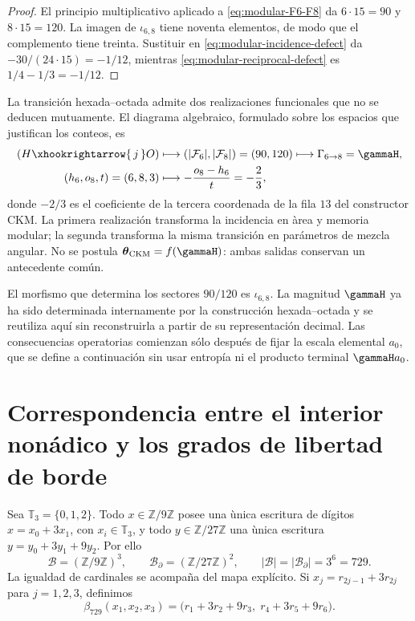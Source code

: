 \begin{proof}
El principio multiplicativo aplicado a
\cref{eq:modular-F6-F8} da \(6\cdot15=90\) y \(8\cdot15=120\).
La imagen de \(\iota_{6,8}\) tiene noventa elementos, de modo que el
complemento tiene treinta. Sustituir en
\cref{eq:modular-incidence-defect} da
\(-30/(24\cdot15)=-1/12\), mientras
\cref{eq:modular-reciprocal-defect} es
\(1/4-1/3=-1/12\).
\end{proof}

La transici\'on hexada--octada admite dos realizaciones funcionales que no
se deducen mutuamente. El diagrama algebraico, formulado sobre los espacios
que justifican los conteos, es
\begin{equation}
\label{eq:modular-68-two-readers}
\begin{aligned}
(H\xhookrightarrow{\,j\,}O)
&\longmapsto
\left(|\mathcal F_6|,|\mathcal F_8|\right)=(90,120)
\longmapsto\Gamma_{6\to8}=\gammaH,\\
(h_6,o_8,t)=(6,8,3)
&\longmapsto-\frac{o_8-h_6}{t}=-\frac23,
\end{aligned}
\end{equation}
donde \(-2/3\) es el coeficiente de la tercera coordenada de la fila
\(13\) del constructor CKM. La primera realizaci\'on transforma la
incidencia en \`area y memoria modular; la segunda transforma la misma
transici\'on en par\'ametros de mezcla angular.
No se postula \(\boldsymbol\theta_{\rm CKM}=f(\gammaH)\): ambas salidas
conservan un antecedente com\'un.

El morfismo que determina los sectores \(90/120\) es
\(\iota_{6,8}\). La magnitud \(\gammaH\) ya ha sido determinada internamente
por la construcci\'on hexada--octada y se reutiliza aqu\'i sin reconstruirla a
partir de su representaci\'on decimal. Las
consecuencias operatorias comienzan s\'olo despu\'es de fijar la escala
elemental \(a_0\), que se define a continuaci\'on sin usar entrop\'ia ni el
producto terminal \(\gammaH a_0\).

\section{Correspondencia entre el interior non\'adico y los grados de libertad de borde}

Sea \(\mathbb T_3=\{0,1,2\}\). Todo \(x\in\mathbb Z/9\mathbb Z\) posee
una \`unica escritura de d\'igitos
\(x=x_0+3x_1\), con \(x_i\in\mathbb T_3\), y todo
\(y\in\mathbb Z/27\mathbb Z\) una \`unica escritura
\(y=y_0+3y_1+9y_2\). Por ello
\begin{equation}
\label{eq:modular-bulk-boundary-729}
\mathcal B=(\mathbb Z/9\mathbb Z)^3,
\qquad
\mathcal B_\partial=(\mathbb Z/27\mathbb Z)^2,
\qquad
|\mathcal B|=|\mathcal B_\partial|=3^6=729.
\end{equation}
La igualdad de cardinales se acompa\~na del mapa expl\'icito. Si
\(x_j=r_{2j-1}+3r_{2j}\) para \(j=1,2,3\), definimos
\begin{equation}
\label{eq:modular-beta729}
\beta_{729}(x_1,x_2,x_3)
=\bigl(r_1+3r_2+9r_3,\;r_4+3r_5+9r_6\bigr).
\end{equation}


